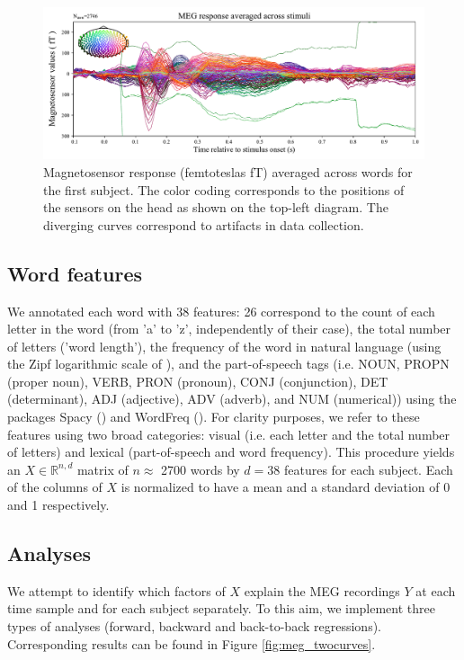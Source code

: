 \begin{figure}
  \centering
  \includegraphics[width=\textwidth, trim=0cm 0cm 0cm 0cm, clip=True]{figures/meg_sensors.pdf}
  \caption{Magnetosensor response (femtoteslas fT) averaged across words for the first subject. The color coding corresponds to the positions of the sensors on the head as shown on the top-left diagram. The diverging curves correspond to artifacts in data collection.}
  \label{fig:megavg}
\end{figure}

\subsection{Word features} We annotated each word with 38 features: 26
correspond to the count of each letter in the word (from 'a' to 'z',
independently of their case), the total number of letters ('word length'), the
frequency of the word in natural language (using the Zipf logarithmic scale
of \cite{van2014subtlex}), and the part-of-speech tags (i.e. NOUN, PROPN (proper
noun), VERB, PRON (pronoun), CONJ (conjunction), DET (determinant), ADJ
(adjective), ADV (adverb), and NUM (numerical)) using the packages Spacy
(\cite{spacy2}) and WordFreq (\cite{speerwordfreq}). For clarity purposes, we refer to these
features using two broad categories: visual (i.e. each letter and the total
number of letters) and lexical (part-of-speech and word frequency).  This
procedure yields an $X \in \mathbb{R}^{n, d}$ matrix of $n\approx$ 2700 words by
$d=38$ features for each subject. Each of the columns of $X$ is normalized to
have a mean and a standard deviation of 0 and 1 respectively.

\subsection{Analyses} We attempt to identify which factors of $X$ explain the MEG
recordings $Y$ at each time sample and for each subject separately. To this aim,
we implement three types of analyses (forward, backward and back-to-back
regressions). Corresponding results can be found in Figure \ref{fig:meg_twocurves}.


